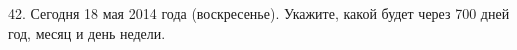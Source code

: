 42. Сегодня 18 мая 2014 года (воскресенье). Укажите, какой будет через 700 дней год, месяц и день недели.\\
